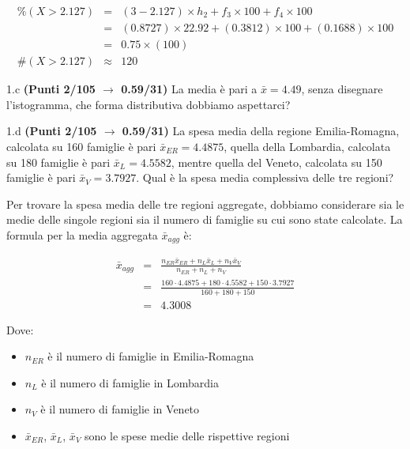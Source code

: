 \documentclass[
  11pt,
]{book}
\providecommand{\tightlist}{%
  \setlength{\itemsep}{0pt}\setlength{\parskip}{0pt}}
\theoremstyle{mytheoremstyle}
\theoremstyle{mydefstyle}
\newenvironment{sol}
  {
  \begin{tcolorbox}[enhanced,breakable,arc=0.1mm,boxrule=1pt,colback=white,colframe=iblue,
  title=\bf \fontfamily{lmss}\selectfont \hspace{.5 cm} Soluzione,drop fuzzy shadow]

}{
\end{tcolorbox}
  }
\begin{document}
\begin{sol}
\begin{eqnarray*}
     \%(X> 2.127 ) &=& ( 3 - 2.127 )\times h_{ 2 }+ f_{ 3 }\times 100+f_{ 4 }\times 100 \\
              &=& ( 0.8727 )\times 22.92 + ( 0.3812 )\times 100+( 0.1688 )\times 100 \\
              &=&  0.75 \times(100)\\
     \#(X> 2.127 ) &\approx& 120 
         \end{eqnarray*}

\end{sol}

1.c \textbf{(Punti 2/105 \(\rightarrow\) 0.59/31)} La media è pari a \(\bar x=4.49\), senza disegnare l'istogramma, che forma distributiva dobbiamo aspettarci?

1.d \textbf{(Punti 2/105 \(\rightarrow\) 0.59/31)} La spesa media della regione Emilia-Romagna, calcolata su 160 famiglie è pari \(\bar x_{ER}=4.4875\), quella della Lombardia, calcolata su 180 famiglie è pari \(\bar x_{L}=4.5582\), mentre quella del Veneto, calcolata su 150 famiglie è pari \(\bar x_{V}=3.7927\). Qual è la spesa media complessiva delle tre regioni?

\begin{sol}

Per trovare la spesa media delle tre regioni aggregate, dobbiamo considerare sia le medie delle singole regioni sia il numero di famiglie su cui sono state calcolate. La formula per la media aggregata \(\bar{x}_{agg}\) è:

\begin{eqnarray*}
\bar{x}_{agg}    &=&  \frac{n_{ER} \bar{x}_{ER} + n_{L} \bar{x}_{L} + n_{V} \bar{x}_{V}}{n_{ER} + n_{L} + n_{V}}\\
&=& \frac{160\cdot4.4875+180\cdot4.5582+150\cdot3.7927}{160+180+150}\\
&=& 4.3008
\end{eqnarray*}

Dove:

\begin{itemize}
\tightlist
\item
  \(n_{ER}\) è il numero di famiglie in Emilia-Romagna
\item
  \(n_{L}\) è il numero di famiglie in Lombardia
\item
  \(n_{V}\) è il numero di famiglie in Veneto
\item
  \(\bar{x}_{ER}\), \(\bar{x}_{L}\), \(\bar{x}_{V}\) sono le spese medie delle rispettive regioni
\end{itemize}

\end{sol}
\end{document}
